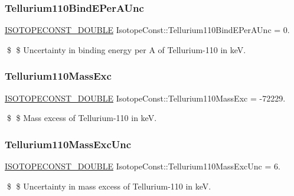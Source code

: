 \subsubsection{\texorpdfstring{Tellurium110\+Bind\+E\+Per\+A\+Unc}{Tellurium110BindEPerAUnc}}
{\footnotesize\ttfamily \mbox{\hyperlink{group___isotope_const-_macros_ga8f45a7272ce02c0b4c65c44636ed719a}{I\+S\+O\+T\+O\+P\+E\+C\+O\+N\+S\+T\+\_\+\+D\+O\+U\+B\+LE}} Isotope\+Const\+::\+Tellurium110\+Bind\+E\+Per\+A\+Unc = 0.}

\$ \$ Uncertainty in binding energy per A of Tellurium-\/110 in keV. \mbox{\label{group___isotope_const-_tellurium-_te110_gae0901111dca2ad2dfcb688293b356b2f}} 
\subsubsection{\texorpdfstring{Tellurium110\+Mass\+Exc}{Tellurium110MassExc}}
{\footnotesize\ttfamily \mbox{\hyperlink{group___isotope_const-_macros_ga8f45a7272ce02c0b4c65c44636ed719a}{I\+S\+O\+T\+O\+P\+E\+C\+O\+N\+S\+T\+\_\+\+D\+O\+U\+B\+LE}} Isotope\+Const\+::\+Tellurium110\+Mass\+Exc = -\/72229.}

\$ \$ Mass excess of Tellurium-\/110 in keV. \mbox{\label{group___isotope_const-_tellurium-_te110_ga1dced3cbc4257718af43a4cddcec8001}} 
\subsubsection{\texorpdfstring{Tellurium110\+Mass\+Exc\+Unc}{Tellurium110MassExcUnc}}
{\footnotesize\ttfamily \mbox{\hyperlink{group___isotope_const-_macros_ga8f45a7272ce02c0b4c65c44636ed719a}{I\+S\+O\+T\+O\+P\+E\+C\+O\+N\+S\+T\+\_\+\+D\+O\+U\+B\+LE}} Isotope\+Const\+::\+Tellurium110\+Mass\+Exc\+Unc = 6.}

\$ \$ Uncertainty in mass excess of Tellurium-\/110 in keV. \mbox{\label{group___isotope_const-_tellurium-_te110_gab9f16bbd9cf5065bfe90bfa3236f4d81}} 

